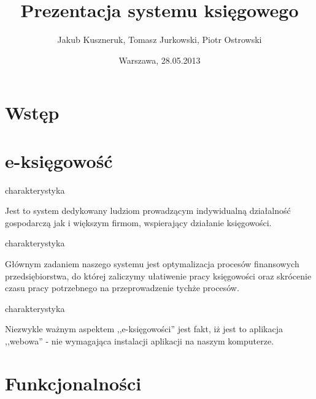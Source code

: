 \documentclass{beamer}
\title
  [Księgowość]
  {Prezentacja systemu księgowego}
\author[grupa 3, podgrupa 2]{Jakub Kuszneruk, Tomasz Jurkowski, Piotr Ostrowski}
\institute[Uniwersytet Warszawski]{
Wydział Matematyki Informatyki i Mechaniki}
\date[2013]{Warszawa, 28.05.2013}
\begin{document}
  \begin{frame}{}
    \titlepage
  \end{frame}
\section{Wstęp}
  \begin{frame}
    \tableofcontents
  \end{frame}
\section{e-księgowość}

  \begin{frame}{charakterystyka}
    \begin{block}{}
      Jest to system dedykowany ludziom prowadzącym indywidualną działalność gospodarczą jak i większym firmom, wspierający działanie księgowości.
    \end{block}
  \end{frame}
  \begin{frame}{charakterystyka}
    \begin{block}{}
      Głównym zadaniem naszego systemu jest optymalizacja procesów finansowych przedsiębiorstwa, do której zaliczymy ułatiwenie pracy księgowości oraz skrócenie czasu pracy potrzebnego na przeprowadzenie tychże procesów.
    \end{block}
  \end{frame}
  \begin{frame}{charakterystyka}
    \begin{block}{}
      Niezwykle ważnym aspektem ,,e-księgowości'' jest fakt, iż jest to aplikacja ,,webowa'' - nie wymagająca instalacji aplikacji na naszym komputerze.
    \end{block}
  \end{frame}
\section{Funkcjonalności}
\end{document}

